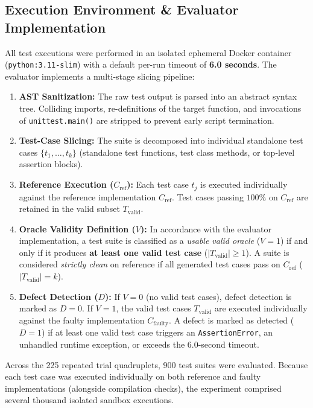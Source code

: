 \documentclass[11pt,a4paper]{article}
\begin{document}
\subsection{Execution Environment \& Evaluator Implementation}
All test executions were performed in an isolated ephemeral Docker container (\texttt{python:3.11-slim}) with a default per-run timeout of \textbf{6.0 seconds}. The evaluator implements a multi-stage slicing pipeline:
\begin{enumerate}
    \item \textbf{AST Sanitization:} The raw test output is parsed into an abstract syntax tree. Colliding imports, re-definitions of the target function, and invocations of \texttt{unittest.main()} are stripped to prevent early script termination.
    \item \textbf{Test-Case Slicing:} The suite is decomposed into individual standalone test cases $\{t_1, \dots, t_k\}$ (standalone test functions, test class methods, or top-level assertion blocks).
    \item \textbf{Reference Execution ($C_{\text{ref}}$):} Each test case $t_j$ is executed individually against the reference implementation $C_{\text{ref}}$. Test cases passing $100\%$ on $C_{\text{ref}}$ are retained in the valid subset $T_{\text{valid}}$.
    \item \textbf{Oracle Validity Definition ($V$):} In accordance with the evaluator implementation, a test suite is classified as a \textit{usable valid oracle} ($V=1$) if and only if it produces \textbf{at least one valid test case} ($|T_{\text{valid}}| \ge 1$). A suite is considered \textit{strictly clean} on reference if all generated test cases pass on $C_{\text{ref}}$ ($|T_{\text{valid}}| = k$).
    \item \textbf{Defect Detection ($D$):} If $V=0$ (no valid test cases), defect detection is marked as $D=0$. If $V=1$, the valid test cases $T_{\text{valid}}$ are executed individually against the faulty implementation $C_{\text{faulty}}$. A defect is marked as detected ($D=1$) if at least one valid test case triggers an \texttt{AssertionError}, an unhandled runtime exception, or exceeds the 6.0-second timeout.
\end{enumerate}
Across the 225 repeated trial quadruplets, 900 test suites were evaluated. Because each test case was executed individually on both reference and faulty implementations (alongside compilation checks), the experiment comprised several thousand isolated sandbox executions.
\end{document}
